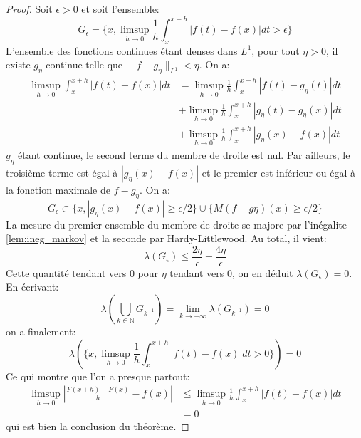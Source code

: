 \begin{proof}
Soit $\epsilon > 0$ et soit l'ensemble:
\[
G_\epsilon  = \{ x, \limsup_{h \to 0}\frac{1}{h} \int_x^{x+h} | f(t) - f(x) |
dt >
\epsilon
\}
\]
L'ensemble des fonctions continues étant denses dans $L^1$, pour tout $\eta >
0$, il existe $g_\eta$ continue telle que $\|f-g_\eta\|_{L^1} < \eta$. On a:
\begin{align*}
 \limsup_{h \to 0} \int_x^{x+h} | f(t) - f(x) | dt & = \limsup_{h \to 0}
 \frac{1}{h} \int_x^{x+h} | f(t) - g_\eta(t) | dt  \\
 & + \limsup_{h \to 0} \frac{1}{h}
 \int_x^{x+h} | g_\eta(t) - g_\eta(x) | dt \\
 & + \limsup_{h \to 0} \frac{1}{h}
 \int_x^{x+h} | g_\eta(x) - f(x) | dt
\end{align*}
$g_\eta$ étant continue, le second terme du membre de droite est nul. Par
ailleurs, le troisième terme est égal à $| g_\eta(x) - f(x) |$ et le premier est
inférieur ou égal à la fonction maximale de $f-g_\eta$.
On a:
\[
G_\epsilon  \subset \{x , | g_\eta(x) - f(x) | \geq \epsilon / 2 \} \cup \{
M(f-g\eta)(x) \geq \epsilon / 2 \}
\]
La mesure du premier ensemble du membre de droite se majore par l'inégalite
\ref{lem:ineg_markov} et la seconde par Hardy-Littlewood. Au total, il vient:
\[
\lambda \left(G_\epsilon\right) \leq \frac{2\eta}{\epsilon} + \frac{4
\eta}{\epsilon}
\]
Cette quantité tendant vers 0 pour $\eta$ tendant vers 0, on en déduit $\lambda
\left(G_\epsilon\right) = 0$.
En écrivant:
\[
\lambda\left(\bigcup_{k
\in \mathbb{N}} G_{k^{-1}} \right ) = \lim_{k \to +\infty} \lambda\left(
G_{k^{-1}} \right ) = 0
\]
on a finalement:
\[
\lambda \left (
\{ x, \limsup_{h \to 0}\frac{1}{h} \int_x^{x+h} | f(t) - f(x) |
dt > 0
\}
\right ) =0
\]
Ce qui montre que l'on a presque partout:
\begin{align*}
\limsup_{h \to 0} \left | \frac{F(x+h)-F(x)}{h} - f(x) \right | & \leq
\limsup_{h \to 0}\frac{1}{h} \int_x^{x+h} | f(t) - f(x) | dt \\
&  = 0
\end{align*}
qui est bien la conclusion du théorème.
\end{proof}

